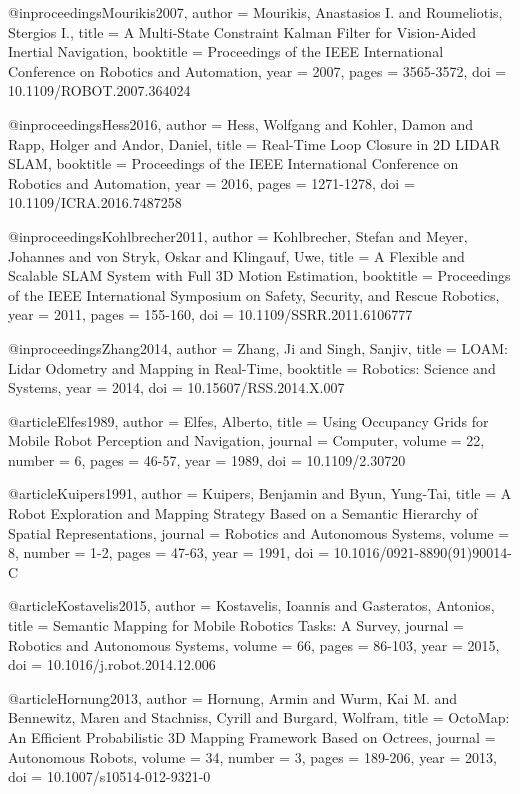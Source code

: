 @inproceedings{Mourikis2007,
  author = {Mourikis, Anastasios I. and Roumeliotis, Stergios I.},
  title = {A Multi-State Constraint Kalman Filter for Vision-Aided Inertial Navigation},
  booktitle = {Proceedings of the IEEE International Conference on Robotics and Automation},
  year = {2007},
  pages = {3565-3572},
  doi = {10.1109/ROBOT.2007.364024}
}

@inproceedings{Hess2016,
  author = {Hess, Wolfgang and Kohler, Damon and Rapp, Holger and Andor, Daniel},
  title = {Real-Time Loop Closure in 2D LIDAR SLAM},
  booktitle = {Proceedings of the IEEE International Conference on Robotics and Automation},
  year = {2016},
  pages = {1271-1278},
  doi = {10.1109/ICRA.2016.7487258}
}

@inproceedings{Kohlbrecher2011,
  author = {Kohlbrecher, Stefan and Meyer, Johannes and von Stryk, Oskar and Klingauf, Uwe},
  title = {A Flexible and Scalable SLAM System with Full 3D Motion Estimation},
  booktitle = {Proceedings of the IEEE International Symposium on Safety, Security, and Rescue Robotics},
  year = {2011},
  pages = {155-160},
  doi = {10.1109/SSRR.2011.6106777}
}

@inproceedings{Zhang2014,
  author = {Zhang, Ji and Singh, Sanjiv},
  title = {LOAM: Lidar Odometry and Mapping in Real-Time},
  booktitle = {Robotics: Science and Systems},
  year = {2014},
  doi = {10.15607/RSS.2014.X.007}
}

@article{Elfes1989,
  author = {Elfes, Alberto},
  title = {Using Occupancy Grids for Mobile Robot Perception and Navigation},
  journal = {Computer},
  volume = {22},
  number = {6},
  pages = {46-57},
  year = {1989},
  doi = {10.1109/2.30720}
}

@article{Kuipers1991,
  author = {Kuipers, Benjamin and Byun, Yung-Tai},
  title = {A Robot Exploration and Mapping Strategy Based on a Semantic Hierarchy of Spatial Representations},
  journal = {Robotics and Autonomous Systems},
  volume = {8},
  number = {1-2},
  pages = {47-63},
  year = {1991},
  doi = {10.1016/0921-8890(91)90014-C}
}

@article{Kostavelis2015,
  author = {Kostavelis, Ioannis and Gasteratos, Antonios},
  title = {Semantic Mapping for Mobile Robotics Tasks: A Survey},
  journal = {Robotics and Autonomous Systems},
  volume = {66},
  pages = {86-103},
  year = {2015},
  doi = {10.1016/j.robot.2014.12.006}
}

@article{Hornung2013,
  author = {Hornung, Armin and Wurm, Kai M. and Bennewitz, Maren and Stachniss, Cyrill and Burgard, Wolfram},
  title = {OctoMap: An Efficient Probabilistic 3D Mapping Framework Based on Octrees},
  journal = {Autonomous Robots},
  volume = {34},
  number = {3},
  pages = {189-206},
  year = {2013},
  doi = {10.1007/s10514-012-9321-0}
}

